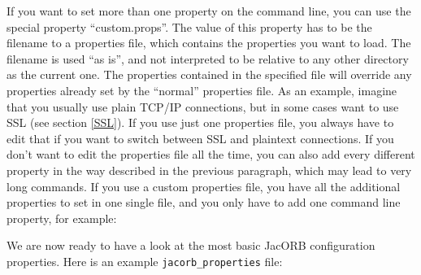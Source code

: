 \documentclass[12pt]{scrbook}
\begin{document}
If you want to set more than one property on the command line, you can use the
special property ``custom.props''. The value of this property has to be the
filename to a properties file, which contains the properties you want to load.
The filename is used ``as is'', and not interpreted to be relative to any
other directory as the current one. The properties contained in the specified
file will override any properties already set by the ``normal'' properties
file. As an example, imagine that you usually use plain TCP/IP connections,
but in some cases want to use SSL (see section \ref{SSL}). If you use just one
properties file, you always have to edit that if you want to switch between
SSL and plaintext connections. If you don't want to edit the properties file
all the time, you can also add every different property in the way described
in the previous paragraph, which may lead to very long commands. If you use a
custom properties file, you have all the additional properties to set in one
single file, and you only have to add one command line property, for example:


We are now ready to have a look at the most basic JacORB configuration
properties.  Here is an example {\tt jacorb\_properties} file: 
\end{document}
